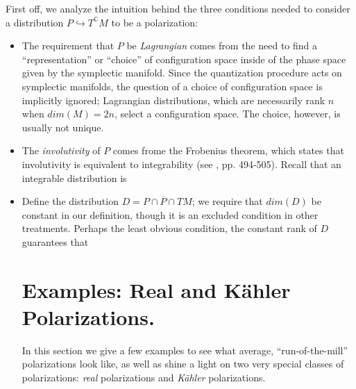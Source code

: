 First off, we analyze the intuition behind the three conditions needed to consider a distribution $P \hookrightarrow T^\mathbb{C}M$ to be a polarization:
\begin{itemize}
\item The requirement that $P$ be \emph{Lagrangian} comes from the need to find a ``representation'' or ``choice'' of configuration space inside of the phase space given by the symplectic manifold. Since the quantization procedure acts on symplectic manifolds, the question of a choice of configuration space is implicitly ignored; Lagrangian distributions, which are necessarily rank $n$ when $dim(M) = 2n$, select a configuration space. The choice, however, is usually not unique. %

\item The \emph{involutivity} of $P$ comes frome the Frobenius theorem, which states that involutivity is equivalent to integrability (see \cite{lee}, pp. 494-505). Recall that an integrable distribution is %

\item Define the distribution $D = P \cap \overline{P} \cap TM$; we require that $dim(D)$ be constant in our definition, though it is an excluded condition in other treatments. Perhaps the least obvious condition, the constant rank of $D$ guarantees that %

















\section{Examples: Real and K\"{a}hler Polarizations.}
In this section we give a few examples to see what average, ``run-of-the-mill'' polarizations look like, as well as shine a light on two very special classes of polarizations: \textit{real} polarizations and \textit{K\"{a}hler} polarizations.



\end{itemize}
